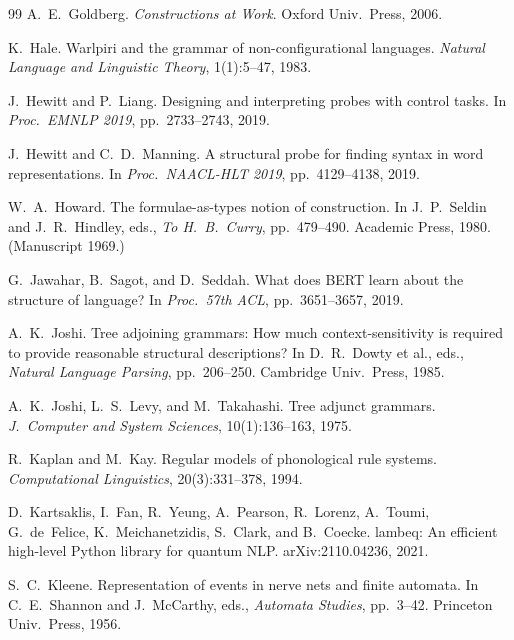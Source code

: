 \documentclass[12pt,a4paper]{article}
\begin{document}
\begin{thebibliography}{99}
A.~E.~Goldberg.
\newblock \emph{Constructions at Work}.
\newblock Oxford Univ.\ Press, 2006.

K.~Hale.
\newblock Warlpiri and the grammar of non-configurational languages.
\newblock \emph{Natural Language and Linguistic Theory}, 1(1):5--47, 1983.

J.~Hewitt and P.~Liang.
\newblock Designing and interpreting probes with control tasks.
\newblock In \emph{Proc.\ EMNLP 2019}, pp.~2733--2743, 2019.

J.~Hewitt and C.~D.~Manning.
\newblock A structural probe for finding syntax in word representations.
\newblock In \emph{Proc.\ NAACL-HLT 2019}, pp.~4129--4138, 2019.

W.~A.~Howard.
\newblock The formulae-as-types notion of construction.
\newblock In J.~P.~Seldin and J.~R.~Hindley, eds., \emph{To H.~B.~Curry}, pp.~479--490. Academic Press, 1980. (Manuscript 1969.)

G.~Jawahar, B.~Sagot, and D.~Seddah.
\newblock What does BERT learn about the structure of language?
\newblock In \emph{Proc.\ 57th ACL}, pp.~3651--3657, 2019.

A.~K.~Joshi.
\newblock Tree adjoining grammars: How much context-sensitivity is required to provide reasonable structural descriptions?
\newblock In D.~R.~Dowty et al., eds., \emph{Natural Language Parsing}, pp.~206--250. Cambridge Univ.\ Press, 1985.

A.~K.~Joshi, L.~S.~Levy, and M.~Takahashi.
\newblock Tree adjunct grammars.
\newblock \emph{J.\ Computer and System Sciences}, 10(1):136--163, 1975.

R.~Kaplan and M.~Kay.
\newblock Regular models of phonological rule systems.
\newblock \emph{Computational Linguistics}, 20(3):331--378, 1994.

D.~Kartsaklis, I.~Fan, R.~Yeung, A.~Pearson, R.~Lorenz, A.~Toumi, G.~de~Felice, K.~Meichanetzidis, S.~Clark, and B.~Coecke.
\newblock lambeq: An efficient high-level Python library for quantum NLP.
\newblock arXiv:2110.04236, 2021.

S.~C.~Kleene.
\newblock Representation of events in nerve nets and finite automata.
\newblock In C.~E.~Shannon and J.~McCarthy, eds., \emph{Automata Studies}, pp.~3--42. Princeton Univ.\ Press, 1956.


\end{thebibliography}
\end{document}

